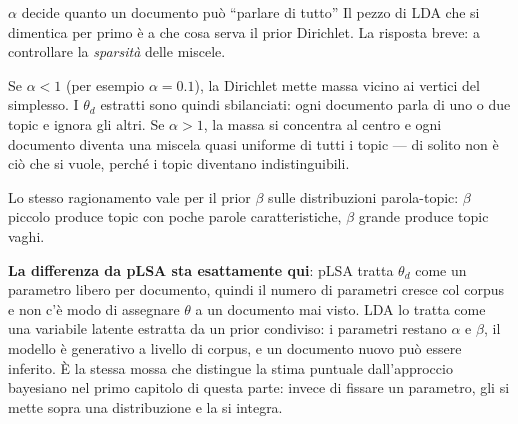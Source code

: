 \begin{intuizione}{$\alpha$ decide quanto un documento può ``parlare di tutto''}
Il pezzo di LDA che si dimentica per primo è a che cosa serva il prior Dirichlet. La risposta breve: a controllare la \emph{sparsità} delle miscele.

Se $\alpha < 1$ (per esempio $\alpha = 0.1$), la Dirichlet mette massa vicino ai vertici del simplesso. I $\theta_d$ estratti sono quindi sbilanciati: ogni documento parla di uno o due topic e ignora gli altri. Se $\alpha > 1$, la massa si concentra al centro e ogni documento diventa una miscela quasi uniforme di tutti i topic — di solito non è ciò che si vuole, perché i topic diventano indistinguibili.

Lo stesso ragionamento vale per il prior $\beta$ sulle distribuzioni parola-topic: $\beta$ piccolo produce topic con poche parole caratteristiche, $\beta$ grande produce topic vaghi.

\textbf{La differenza da pLSA sta esattamente qui}: pLSA tratta $\theta_d$ come un parametro libero per documento, quindi il numero di parametri cresce col corpus e non c'è modo di assegnare $\theta$ a un documento mai visto. LDA lo tratta come una variabile latente estratta da un prior condiviso: i parametri restano $\alpha$ e $\beta$, il modello è generativo a livello di corpus, e un documento nuovo può essere inferito. È la stessa mossa che distingue la stima puntuale dall'approccio bayesiano nel primo capitolo di questa parte: invece di fissare un parametro, gli si mette sopra una distribuzione e la si integra.
\end{intuizione}

